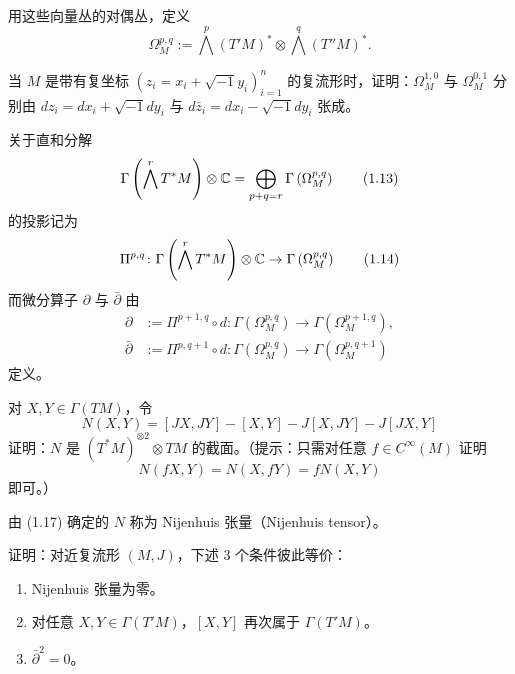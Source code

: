 用这些向量丛的对偶丛，定义
\begin{equation}
    \Omega^{p,q}_M := \bigwedge^p(T'M)^*\otimes\bigwedge^q(T''M)^*. \tag{1.12}
\end{equation}

\begin{exercise}
当 $M$ 是带有复坐标 $(z_i=x_i+\sqrt{-1}y_i)_{i=1}^n$ 的复流形时，证明：$\Omega^{1,0}_M$ 与 $\Omega^{0,1}_M$ 分别由 $dz_i=dx_i+\sqrt{-1}dy_i$ 与 $d\bar z_i=dx_i-\sqrt{-1}dy_i$ 张成。
\end{exercise}

关于直和分解
\begin{equation}
    \Gamma\left(\bigwedge^rT^*M\right)\otimes\mathbb{C} = \bigoplus_{p+q=r}\Gamma\left(\Omega^{p,q}_M\right) \tag{1.13}
\end{equation}
的投影记为
\begin{equation}
    \Pi^{p,q}\colon\Gamma\left(\bigwedge^rT^*M\right)\otimes\mathbb{C} \to \Gamma\left(\Omega^{p,q}_M\right) \tag{1.14}
\end{equation}
而微分算子 $\partial$ 与 $\bar\partial$ 由
\begin{align}
    \partial &:= \Pi^{p+1,q}\circ d\colon\Gamma\left(\Omega^{p,q}_M\right)\to\Gamma\left(\Omega^{p+1,q}_M\right), \tag{1.15}\\
    \bar\partial &:= \Pi^{p,q+1}\circ d\colon\Gamma\left(\Omega^{p,q}_M\right)\to\Gamma\left(\Omega^{p,q+1}_M\right) \tag{1.16}
\end{align}
定义。

\begin{exercise}
对 $X,Y\in\Gamma(TM)$，令
\begin{equation}
    N(X,Y) = [JX,JY]-[X,Y]-J[X,JY]-J[JX,Y] \tag{1.17}
\end{equation}
证明：$N$ 是 $(T^*M)^{\otimes 2}\otimes TM$ 的截面。（提示：只需对任意 $f\in C^\infty(M)$ 证明
\begin{equation}
    N(fX,Y)=N(X,fY)=fN(X,Y) \tag{1.18}
\end{equation}
即可。）
\end{exercise}

\begin{definition}
由 (1.17) 确定的 $N$ 称为 Nijenhuis 张量（Nijenhuis tensor）。
\end{definition}

\begin{exercise}
证明：对近复流形 $(M,J)$，下述 3 个条件彼此等价：
\begin{enumerate}
    \item Nijenhuis 张量为零。
    \item 对任意 $X,Y\in\Gamma(T'M)$，$[X,Y]$ 再次属于 $\Gamma(T'M)$。
    \item $\bar\partial^2=0$。
\end{enumerate}
\end{exercise}

